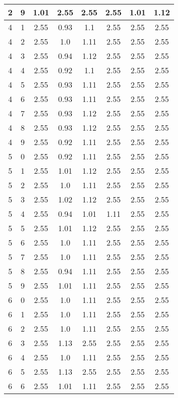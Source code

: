 \begin{longtable}{|c|c||c||c|c|c||c|c|}
	2 & 9 & 1.01 & 2.55 & 2.55 & 2.55 & 1.01 & 1.12 \\ \hline
	4 & 1 & 2.55 & 0.93 & 1.1 & 2.55 & 2.55 & 2.55 \\ \hline
	4 & 2 & 2.55 & 1.0 & 1.11 & 2.55 & 2.55 & 2.55 \\ \hline
	4 & 3 & 2.55 & 0.94 & 1.12 & 2.55 & 2.55 & 2.55 \\ \hline
	4 & 4 & 2.55 & 0.92 & 1.1 & 2.55 & 2.55 & 2.55 \\ \hline
	4 & 5 & 2.55 & 0.93 & 1.11 & 2.55 & 2.55 & 2.55 \\ \hline
	4 & 6 & 2.55 & 0.93 & 1.11 & 2.55 & 2.55 & 2.55 \\ \hline
	4 & 7 & 2.55 & 0.93 & 1.12 & 2.55 & 2.55 & 2.55 \\ \hline
	4 & 8 & 2.55 & 0.93 & 1.12 & 2.55 & 2.55 & 2.55 \\ \hline
	4 & 9 & 2.55 & 0.92 & 1.11 & 2.55 & 2.55 & 2.55 \\ \hline
	5 & 0 & 2.55 & 0.92 & 1.11 & 2.55 & 2.55 & 2.55 \\ \hline
	5 & 1 & 2.55 & 1.01 & 1.12 & 2.55 & 2.55 & 2.55 \\ \hline
	5 & 2 & 2.55 & 1.0 & 1.11 & 2.55 & 2.55 & 2.55 \\ \hline
	5 & 3 & 2.55 & 1.02 & 1.12 & 2.55 & 2.55 & 2.55 \\ \hline
	5 & 4 & 2.55 & 0.94 & 1.01 & 1.11 & 2.55 & 2.55 \\ \hline
	5 & 5 & 2.55 & 1.01 & 1.12 & 2.55 & 2.55 & 2.55 \\ \hline
	5 & 6 & 2.55 & 1.0 & 1.11 & 2.55 & 2.55 & 2.55 \\ \hline
	5 & 7 & 2.55 & 1.0 & 1.11 & 2.55 & 2.55 & 2.55 \\ \hline
	5 & 8 & 2.55 & 0.94 & 1.11 & 2.55 & 2.55 & 2.55 \\ \hline
	5 & 9 & 2.55 & 1.01 & 1.11 & 2.55 & 2.55 & 2.55 \\ \hline
	6 & 0 & 2.55 & 1.0 & 1.11 & 2.55 & 2.55 & 2.55 \\ \hline
	6 & 1 & 2.55 & 1.0 & 1.11 & 2.55 & 2.55 & 2.55 \\ \hline
	6 & 2 & 2.55 & 1.0 & 1.11 & 2.55 & 2.55 & 2.55 \\ \hline
	6 & 3 & 2.55 & 1.13 & 2.55 & 2.55 & 2.55 & 2.55 \\ \hline
	6 & 4 & 2.55 & 1.0 & 1.11 & 2.55 & 2.55 & 2.55 \\ \hline
	6 & 5 & 2.55 & 1.13 & 2.55 & 2.55 & 2.55 & 2.55 \\ \hline
	6 & 6 & 2.55 & 1.01 & 1.11 & 2.55 & 2.55 & 2.55 \\ \hline

\end{longtable}
